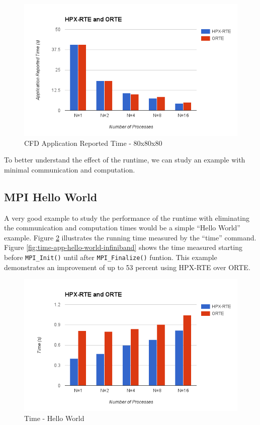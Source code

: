 \begin{figure}[h]
  \centering
  \includegraphics[scale=0.7]{images/time-app-heatsolver-80-infiniband.png}
  \caption[CFD Application Reported Time - 80x80x80]{CFD Application Reported Time - 80x80x80}
  \label{fig:time-app-heatsolver-80-infiniband}
\end{figure}
    
To better understand the effect of the runtime, we can study an example with minimal communication and computation. 


\subsection{MPI Hello World}
A very good example to study the performance of the runtime with eliminating the communication and computation times would be a simple ``Hello World'' example. Figure \ref{fig:time-all-hello-world-infiniband} illustrates the running time measured by the ``time'' command. Figure \ref{fig:time-app-hello-world-infiniband} shows the time measured starting before \verb|MPI_Init()| until after \verb|MPI_Finalize()| funtion. This example demonstrates an improvement of up to 53 percent using HPX-RTE over ORTE.

\begin{figure}[h!]
\centering
\includegraphics[scale=0.7]{images/time-all-hello-world-infiniband.png}
\caption[Time - Hello World]{Time - Hello World}
\label{fig:time-all-hello-world-infiniband}
\end{figure}

